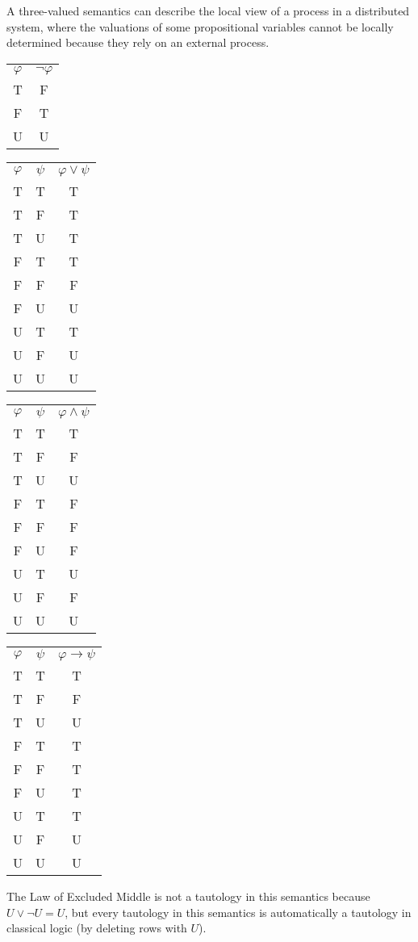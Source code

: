 \documentclass[a4paper]{article}
\begin{document}
\section{}
A three-valued semantics can describe the local view of a process in a distributed system, where the valuations of some propositional variables cannot be locally determined because they rely on an external process.

\begin{tabular}[t]{c|c}
  $\varphi$ & $\lnot \varphi$\\
  T & F\\
  F & T\\
  U & U\\
\end{tabular}
\qquad
\begin{tabular}[t]{cc|c}
  $\varphi$ & $\psi$ & $\varphi \vee \psi$\\
  T & T & T\\
  T & F & T\\
  T & U & T\\
  F & T & T\\
  F & F & F\\
  F & U & U\\
  U & T & T\\
  U & F & U\\
  U & U & U\\
\end{tabular}
\qquad
\begin{tabular}[t]{cc|c}
  $\varphi$ & $\psi$ & $\varphi \wedge \psi$\\
  T & T & T\\
  T & F & F\\
  T & U & U\\
  F & T & F\\
  F & F & F\\
  F & U & F\\
  U & T & U\\
  U & F & F\\
  U & U & U\\
\end{tabular}
\qquad
\begin{tabular}[t]{cc|c}
  $\varphi$ & $\psi$ & $\varphi \to \psi$\\
  T & T & T\\
  T & F & F\\
  T & U & U\\
  F & T & T\\
  F & F & T\\
  F & U & T\\
  U & T & T\\
  U & F & U\\
  U & U & U\\
\end{tabular}

The Law of Excluded Middle is not a tautology in this semantics because $U \vee \lnot U = U$, but every tautology in this semantics is automatically a tautology in classical logic (by deleting rows with $U$).

\end{document}
